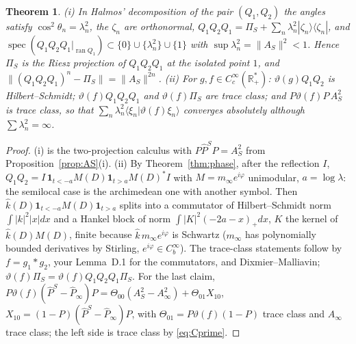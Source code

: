 \documentclass[11pt]{amsart}
\newtheorem{theorem}{Theorem}[section]
\theoremstyle{definition}
\theoremstyle{remark}
\newcommand{\R}{\mathbb R}
\newcommand{\ran}{\operatorname{ran}}
\newcommand{\Pih}{\widehat P}
\begin{document}
\begin{theorem}\label{thm:gap}
\emph{(i)} In Halmos' decomposition of the pair $(Q_1,Q_2)$ the angles satisfy $\cos^2\theta_n=\lambda_n^2$, the $\zeta_n$
are orthonormal, $Q_1Q_2Q_1=\Pi_S+\sum_n\lambda_n^2|\zeta_n\rangle\langle\zeta_n|$, and
$\operatorname{spec}(Q_1Q_2Q_1|_{\ran Q_1})\subset\{0\}\cup\{\lambda_n^2\}\cup\{1\}$ with $\sup\lambda_n^2=\|A_S\|^2<1$. Hence
$\Pi_S$ is the Riesz projection of $Q_1Q_2Q_1$ at the isolated point $1$, and
$\|(Q_1Q_2Q_1)^n-\Pi_S\|=\|A_S\|^{2n}$.
\emph{(ii)} For $g,f\in C_c^\infty(\R_+^*)$: $\vartheta(g)Q_1Q_2$ is Hilbert--Schmidt; $\vartheta(f)Q_1Q_2Q_1$ and
$\vartheta(f)\Pi_S$ are trace class; and $P\vartheta(f)P\,A_S^2$ is trace class, so that
$\sum_n\lambda_n^2\langle\xi_n|\vartheta(f)\xi_n\rangle$ converges absolutely although $\sum\lambda_n^2=\infty$.
\end{theorem}
\begin{proof}
(i) is the two-projection calculus \cite{Halmos1969} with $P\Pih^SP=A_S^2$ from Proposition~\ref{prop:AS}(i).
(ii) By Theorem~\ref{thm:phase}, after the reflection $I$, $Q_1Q_2=I\,\mathbf 1_{t<-a}M(D)\mathbf 1_{t>a}M(D)^*I$ with
$M=m_\infty e^{i\varphi}$ unimodular, $a=\log\lambda$: the semilocal case is the archimedean one with another
symbol. Then $\widehat k(D)\mathbf 1_{t<-a}M(D)\mathbf 1_{t>a}$ splits into a commutator of Hilbert--Schmidt norm
$\int|k|^2|x|dx$ and a Hankel block of norm $\int|K|^2(-2a-x)_+dx$, $K$ the kernel of $\widehat k(D)M(D)$, finite because $\widehat k\,m_\infty e^{i\varphi}$ is
Schwartz ($m_\infty$ has polynomially bounded derivatives by Stirling, $e^{i\varphi}\in C_b^\infty$). The trace-class
statements follow by $f=g_1*g_2$, your Lemma~D.1 for the commutators, and Dixmier--Malliavin;
$\vartheta(f)\Pi_S=\vartheta(f)Q_1Q_2Q_1\Pi_S$. For the last claim, $P\vartheta(f)(\Pih^S-\Pih_\infty)P=\Theta_{00}(A_S^2-A_\infty^2)+\Theta_{01}X_{10}$, $X_{10}=(1-P)(\Pih^S-\Pih_\infty)P$,
with $\Theta_{01}=P\vartheta(f)(1-P)$ trace class and $A_\infty$ trace class; the left side is trace class by \eqref{eq:Cprime}.
\end{proof}
\end{document}
